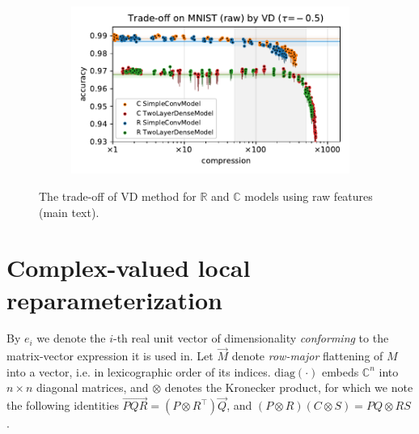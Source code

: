 \documentclass[a4paper,10pt,twocolumn]{article}
\newcommand{\real}{\mathbb{R}}
\newcommand{\cplx}{\mathbb{C}}
\renewcommand{\vec}[1]{\overrightarrow{#1}}
\newcommand{\diag}[1]{\mathrm{diag}{#1}}
\begin{document}
\begin{figure}[b]
\begin{subfigure}[b]{0.5\columnwidth}
  \end{subfigure}%
  \begin{subfigure}[b]{0.5\columnwidth}
    \centering
    \includegraphics[width=\linewidth]{figure__mnist-like__trade-off/legacy__VD__mnist__raw__-0.5.pdf}
  \end{subfigure}
  \caption{%
    The trade-off of VD method for $\real$ and $\cplx$ models using raw features (main text).
  }
  \label{fig:paper__mnist-like__trade-off__VD__raw}
\end{figure}



\section{Complex-valued local reparameterization} %
\label{sec:complex_valued_local_reparameterization}

By $e_i$ we denote the $i$-th real unit vector of dimensionality \emph{conforming} to the
matrix-vector expression it is used in. Let $\vec{M}$ denote \emph{row-major} flattening
of $M$ into a vector, i.e. in lexicographic order of its indices. $\diag{(\cdot)}$ embeds
$\cplx^n$ into $n\times n$ diagonal matrices, and $\otimes$ denotes the Kronecker product,
for which we note the following identities $
  \vec{P Q R} = (P \otimes R^\top) \vec{Q}
$, and $
  (P \otimes R) (C \otimes S) = P Q \otimes R S
$ \citep{petersen_matrix_2012}.
\end{document}
